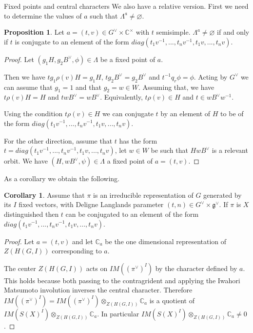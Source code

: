 \documentclass[12pt]{article}
\newcommand{\C}{\mathbb{C}}
\newcommand{\<}{\langle}
\renewcommand{\>}{\rangle}
\renewcommand{\emptyset}{\varnothing}
\theoremstyle{plain}
\theoremstyle{definition}
\newtheorem{prop}[theorem]{Proposition}
\newtheorem{cor}[theorem]{Corollary}
\begin{document}
\begin{section}{Fixed points and central characters}
We also have a relative version. First we need to determine the values of $a$ such that $\Lambda^a\neq\emptyset$.

\begin{prop}\label{non_empty_fixed_points}
    Let $a=(t,v)\in G^\vee\times\C^\times$ with $t$ semisimple. $\Lambda^a\neq\emptyset$ if and only if $t$ is conjugate to an element of the form $diag(t_1v^{-1},...,t_nv^{-1},t_1v,...,t_nv)$.
\end{prop}

\begin{proof}
    Let $(g_1H,g_2B^\vee,\phi)\in\Lambda$ be a fixed point of $a$. 
    
    Then we have $tg_1\rho(v)H=g_1H$, $tg_2B^\vee=g_2B^\vee$ and $t^{-1}q_r\phi=\phi$. Acting by $G^\vee$ we can assume that $g_1=1$ and that $g_2=w\in W$. Assuming that, we have $t\rho(v)H=H$ and $twB^\vee=wB^\vee$. Equivalently, $t\rho(v)\in H$ and $t\in wB^\vee w^{-1}$.   

    Using the condition $t\rho(v)\in H$ we can conjugate $t$ by an element of $H$ to be of the form $diag(t_1v^{-1},...,t_nv^{-1},t_1v,...,t_nv)$.

    For the other direction, assume that $t$ has the form $t=diag(t_1v^{-1},...,t_nv^{-1},t_1v,...,t_nv)$, let $w\in W$ be such that $HwB^\vee$ is a relevant orbit. We have $(H,wB^\vee,\psi)\in \Lambda$ a fixed point of $a=(t,v)$.
\end{proof}


As a corollary we obtain the following.

\begin{cor}\label{central cahrachter}
    Assume that $\pi$ is an irreducible representation of $G$ generated by its $I$ fixed vectors, with Deligne Langlands parameter $(t,n)\in G^\vee\times\mathfrak{g}^\vee$. If $\pi$ is $X$ distinguished then $t$ can be conjugated to an element of the form  $diag(t_1v^{-1},...,t_nv^{-1},t_1v,...,t_nv)$.
\end{cor}

\begin{proof}
    Let $a=(t,v)$ and let $\C_a$ be the one dimensional representation of $Z(H(G,I))$ corresponding to $a$. 

    The center $Z(H(G,I))$ acts on $IM((\pi^\vee)^I)$ by the character defined by $a$. This holds because both passing to the contragrident and applying the Iwahori Matsumoto involution inverses the central character. Therefore $IM((\pi^\vee)^I)=IM((\pi^\vee)^I)\otimes_{Z(H(G,I))}\C_a$ is a quotient of $IM(S(X)^I)\otimes_{Z(H(G,I))} \C_a$. In particular $IM(S(X)^I)\otimes_{Z(H(G,I))} \C_a\neq 0$.


\end{proof}
\end{section}
\end{document}
